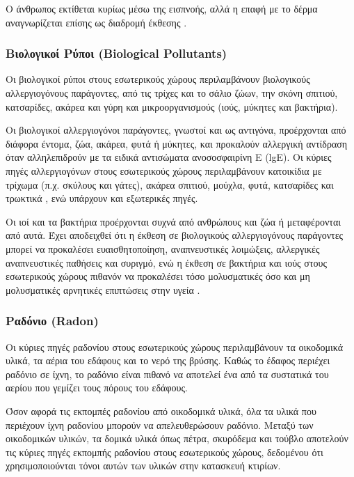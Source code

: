 Ο άνθρωπος εκτίθεται κυρίως μέσω της εισπνοής, αλλά η επαφή με το δέρμα αναγνωρίζεται επίσης ως διαδρομή έκθεσης 
\cite{ijerph17082927}.

\subsubsection{Βιολογικοί Ρύποι (Biological Pollutants)}


Οι βιολογικοί ρύποι στους εσωτερικούς χώρους περιλαμβάνουν βιολογικούς αλλεργιογόνους παράγοντες,
από τις τρίχες και το σάλιο ζώων, την σκόνη σπιτιού, κατσαρίδες, ακάρεα και γύρη και μικροοργανισμούς (ιούς, μύκητες και βακτήρια).

Οι βιολογικοί αλλεργιογόνοι παράγοντες, γνωστοί και ως αντιγόνα, προέρχονται από διάφορα έντομα, ζώα, ακάρεα, φυτά ή μύκητες, και προκαλούν αλλεργική αντίδραση όταν αλληλεπιδρούν με τα ειδικά αντισώματα ανοσοσφαιρίνη E (lgE).
Οι κύριες πηγές αλλεργιογόνων στους εσωτερικούς χώρους περιλαμβάνουν κατοικίδια με τρίχωμα (π.χ. σκύλους και γάτες), ακάρεα σπιτιού, μούχλα, φυτά, κατσαρίδες και τρωκτικά , ενώ υπάρχουν και εξωτερικές πηγές.

Οι ιοί και τα βακτήρια προέρχονται συχνά από ανθρώπους και ζώα ή μεταφέρονται από αυτά. Έχει αποδειχθεί ότι η έκθεση σε βιολογικούς αλλεργιογόνους παράγοντες μπορεί να προκαλέσει ευαισθητοποίηση, αναπνευστικές λοιμώξεις, αλλεργικές αναπνευστικές παθήσεις και συριγμό, 
ενώ η έκθεση σε βακτήρια και ιούς στους εσωτερικούς χώρους πιθανόν να προκαλέσει τόσο μολυσματικές όσο και μη μολυσματικές αρνητικές επιπτώσεις στην υγεία \cite{ijerph17082927}.

\subsubsection{Ραδόνιο (Radon)}

Οι κύριες πηγές ραδονίου στους εσωτερικούς χώρους περιλαμβάνουν τα οικοδομικά υλικά, τα αέρια του εδάφους και το νερό της βρύσης.
Καθώς το έδαφος περιέχει ραδόνιο σε ίχνη, το ραδόνιο είναι πιθανό να αποτελεί ένα από τα συστατικά του αερίου που γεμίζει τους πόρους του εδάφους.

Όσον αφορά τις εκπομπές ραδονίου από οικοδομικά υλικά, όλα τα υλικά που περιέχουν ίχνη ραδονίου μπορούν να απελευθερώσουν ραδόνιο.
Μεταξύ των οικοδομικών υλικών, τα δομικά υλικά όπως πέτρα, σκυρόδεμα και τούβλο αποτελούν τις κύριες πηγές εκπομπής ραδονίου στους εσωτερικούς χώρους, δεδομένου ότι χρησιμοποιούνται τόνοι αυτών των υλικών στην κατασκευή κτιρίων.

